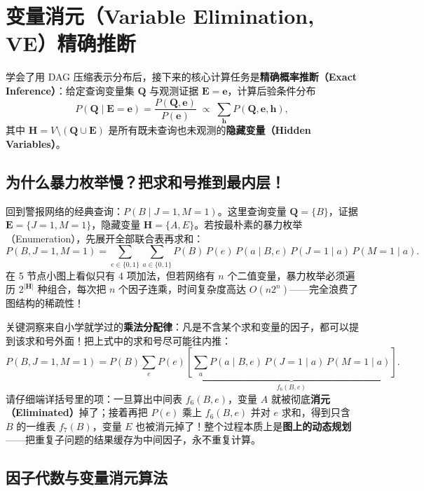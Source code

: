 \section{变量消元（Variable Elimination, VE）精确推断}\label{sec:bn-ve}

学会了用 DAG 压缩表示分布后，接下来的核心计算任务是\textbf{精确概率推断（Exact Inference）}：给定查询变量集 $\mathbf{Q}$ 与观测证据 $\mathbf{E} = \mathbf{e}$，计算后验条件分布
\[
  P(\mathbf{Q} \mid \mathbf{E} = \mathbf{e}) = \frac{P(\mathbf{Q}, \mathbf{e})}{P(\mathbf{e})}
  \;\propto\; \sum_{\mathbf{h}} P(\mathbf{Q}, \mathbf{e}, \mathbf{h}),
\]
其中 $\mathbf{H} = V \setminus (\mathbf{Q} \cup \mathbf{E})$ 是所有既未查询也未观测的\textbf{隐藏变量（Hidden Variables）}。

\subsection{为什么暴力枚举慢？把求和号推到最内层！}

回到警报网络的经典查询：$P(B \mid J=1, M=1)$。这里查询变量 $\mathbf{Q}=\{B\}$，证据 $\mathbf{E}=\{J=1, M=1\}$，隐藏变量 $\mathbf{H}=\{A, E\}$。若按最朴素的暴力枚举（Enumeration），先展开全部联合表再求和：
\[
  P(B, J=1, M=1) = \sum_{e \in \{0,1\}} \sum_{a \in \{0,1\}} P(B)\, P(e)\, P(a \mid B, e)\, P(J=1 \mid a)\, P(M=1 \mid a).
\]
在 5 节点小图上看似只有 4 项加法，但若网络有 $n$ 个二值变量，暴力枚举必须遍历 $2^{|\mathbf{H}|}$ 种组合，每次把 $n$ 个因子连乘，时间复杂度高达 $O(n 2^n)$——完全浪费了图结构的稀疏性！

关键洞察来自小学就学过的\textbf{乘法分配律}：凡是不含某个求和变量的因子，都可以提到该求和号外面！把上式中的求和号尽可能往内推：
\begin{equation}\label{eq:ve-pushsum}
  P(B, J=1, M=1)
  = P(B) \sum_{e} P(e) \underbrace{\left[\sum_{a} P(a \mid B, e)\, P(J=1 \mid a)\, P(M=1 \mid a)\right]}_{f_6(B, e)}.
\end{equation}
请仔细端详括号里的项：一旦算出中间表 $f_6(B, e)$，变量 $A$ 就被彻底\textbf{消元（Eliminated）}掉了；接着再把 $P(e)$ 乘上 $f_6(B, e)$ 并对 $e$ 求和，得到只含 $B$ 的一维表 $f_7(B)$，变量 $E$ 也被消元掉了！整个过程本质上是\textbf{图上的动态规划}——把重复子问题的结果缓存为中间因子，永不重复计算。

\subsection{因子代数与变量消元算法}

